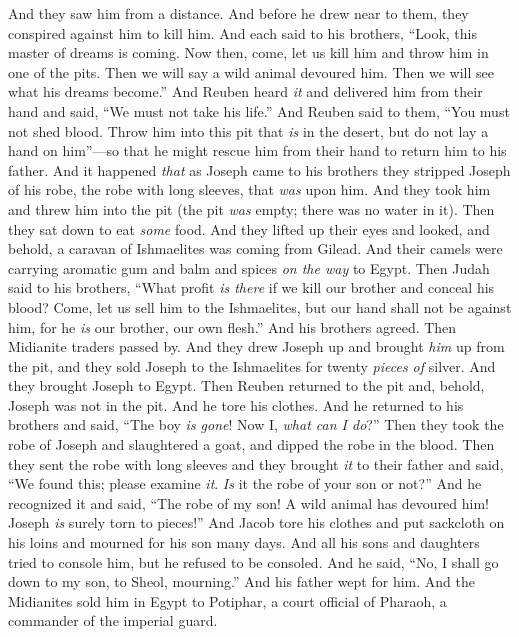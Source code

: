 \begin{biblechapter}
\verse And they saw him from a distance. And before he drew near to them, they conspired against him to kill him.
\verse And each said to his brothers, “Look, this master of dreams is coming.
\verse Now then, come, let us kill him and throw him in one of the pits. Then we will say a wild animal devoured him. Then we will see what his dreams become.”
\verse And Reuben heard \textit{it} and delivered him from their hand and said, “We must not take his life.”
\verse And Reuben said to them, “You must not shed blood. Throw him into this pit that \textit{is} in the desert, but do not lay a hand on him”—so that he might rescue him from their hand to return him to his father.
\verse And it happened \textit{that} as Joseph came to his brothers they stripped Joseph of his robe, the robe with long sleeves, that \textit{was} upon him.
\verse And they took him and threw him into the pit (the pit \textit{was} empty; there was no water in it).
\verse Then they sat down to eat \textit{some} food. And they lifted up their eyes and looked, and behold, a caravan of Ishmaelites was coming from Gilead. And their camels were carrying aromatic gum and balm and spices \textit{on the way} to Egypt.
\verse Then Judah said to his brothers, “What profit \textit{is there} if we kill our brother and conceal his blood?
\verse Come, let us sell him to the Ishmaelites, but our hand shall not be against him, for he \textit{is} our brother, our own flesh.” And his brothers agreed.
\verse Then Midianite traders passed by. And they drew Joseph up and brought \textit{him} up from the pit, and they sold Joseph to the Ishmaelites for twenty \textit{pieces of} silver. And they brought Joseph to Egypt.
\verse Then Reuben returned to the pit and, behold, Joseph was not in the pit. And he tore his clothes.
\verse And he returned to his brothers and said, “The boy \textit{is gone}! Now I, \textit{what can I do}?”
\verse Then they took the robe of Joseph and slaughtered a goat, and dipped the robe in the blood.
\verse Then they sent the robe with long sleeves and they brought \textit{it} to their father and said, “We found this; please examine \textit{it}. \textit{Is} it the robe of your son or not?”
\verse And he recognized it and said, “The robe of my son! A wild animal has devoured him! Joseph \textit{is} surely torn to pieces!”
\verse And Jacob tore his clothes and put sackcloth on his loins and mourned for his son many days.
\verse And all his sons and daughters tried to console him, but he refused to be consoled. And he said, “No, I shall go down to my son, to Sheol, mourning.” And his father wept for him.
\verse And the Midianites sold him in Egypt to Potiphar, a court official of Pharaoh, a commander of the imperial guard.
\end{biblechapter}


